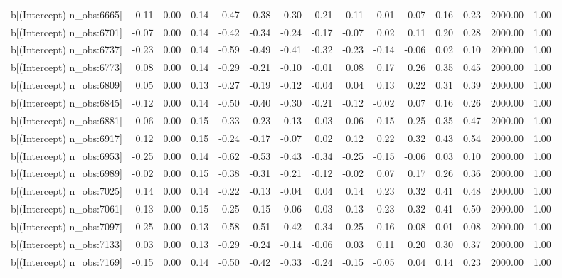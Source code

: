 \begin{table}[ht]
\begin{tabular}{rrrrrrrrrrrrrrr}
  b[(Intercept) n\_obs:6665] & -0.11 & 0.00 & 0.14 & -0.47 & -0.38 & -0.30 & -0.21 & -0.11 & -0.01 & 0.07 & 0.16 & 0.23 & 2000.00 & 1.00 \\ 
  b[(Intercept) n\_obs:6701] & -0.07 & 0.00 & 0.14 & -0.42 & -0.34 & -0.24 & -0.17 & -0.07 & 0.02 & 0.11 & 0.20 & 0.28 & 2000.00 & 1.00 \\ 
  b[(Intercept) n\_obs:6737] & -0.23 & 0.00 & 0.14 & -0.59 & -0.49 & -0.41 & -0.32 & -0.23 & -0.14 & -0.06 & 0.02 & 0.10 & 2000.00 & 1.00 \\ 
  b[(Intercept) n\_obs:6773] & 0.08 & 0.00 & 0.14 & -0.29 & -0.21 & -0.10 & -0.01 & 0.08 & 0.17 & 0.26 & 0.35 & 0.45 & 2000.00 & 1.00 \\ 
  b[(Intercept) n\_obs:6809] & 0.05 & 0.00 & 0.13 & -0.27 & -0.19 & -0.12 & -0.04 & 0.04 & 0.13 & 0.22 & 0.31 & 0.39 & 2000.00 & 1.00 \\ 
  b[(Intercept) n\_obs:6845] & -0.12 & 0.00 & 0.14 & -0.50 & -0.40 & -0.30 & -0.21 & -0.12 & -0.02 & 0.07 & 0.16 & 0.26 & 2000.00 & 1.00 \\ 
  b[(Intercept) n\_obs:6881] & 0.06 & 0.00 & 0.15 & -0.33 & -0.23 & -0.13 & -0.03 & 0.06 & 0.15 & 0.25 & 0.35 & 0.47 & 2000.00 & 1.00 \\ 
  b[(Intercept) n\_obs:6917] & 0.12 & 0.00 & 0.15 & -0.24 & -0.17 & -0.07 & 0.02 & 0.12 & 0.22 & 0.32 & 0.43 & 0.54 & 2000.00 & 1.00 \\ 
  b[(Intercept) n\_obs:6953] & -0.25 & 0.00 & 0.14 & -0.62 & -0.53 & -0.43 & -0.34 & -0.25 & -0.15 & -0.06 & 0.03 & 0.10 & 2000.00 & 1.00 \\ 
  b[(Intercept) n\_obs:6989] & -0.02 & 0.00 & 0.15 & -0.38 & -0.31 & -0.21 & -0.12 & -0.02 & 0.07 & 0.17 & 0.26 & 0.36 & 2000.00 & 1.00 \\ 
  b[(Intercept) n\_obs:7025] & 0.14 & 0.00 & 0.14 & -0.22 & -0.13 & -0.04 & 0.04 & 0.14 & 0.23 & 0.32 & 0.41 & 0.48 & 2000.00 & 1.00 \\ 
  b[(Intercept) n\_obs:7061] & 0.13 & 0.00 & 0.15 & -0.25 & -0.15 & -0.06 & 0.03 & 0.13 & 0.23 & 0.32 & 0.41 & 0.50 & 2000.00 & 1.00 \\ 
  b[(Intercept) n\_obs:7097] & -0.25 & 0.00 & 0.13 & -0.58 & -0.51 & -0.42 & -0.34 & -0.25 & -0.16 & -0.08 & 0.01 & 0.08 & 2000.00 & 1.00 \\ 
  b[(Intercept) n\_obs:7133] & 0.03 & 0.00 & 0.13 & -0.29 & -0.24 & -0.14 & -0.06 & 0.03 & 0.11 & 0.20 & 0.30 & 0.37 & 2000.00 & 1.00 \\ 
  b[(Intercept) n\_obs:7169] & -0.15 & 0.00 & 0.14 & -0.50 & -0.42 & -0.33 & -0.24 & -0.15 & -0.05 & 0.04 & 0.14 & 0.23 & 2000.00 & 1.00 \\ 

\end{tabular}
\end{table}
